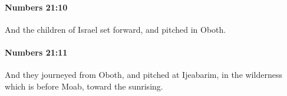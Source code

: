 		\paragraph{Numbers 21:10} %
			\label{NUMBERS-21-10}

			And the children of Israel set forward, and pitched in Oboth.


		\paragraph{Numbers 21:11} %
			\label{NUMBERS-21-11}

			And they journeyed from Oboth, and pitched at Ijeabarim, in the wilderness which is before Moab, toward the sunrising.



